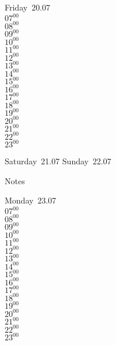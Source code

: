 \documentclass[11pt, a4paper]{book}\usepackage[]{graphicx}\usepackage[]{color}
\begin{document}
\begin{weekdaybox}
  Friday~20.07\\
  { 
  \vfill
  $07^{00}$\\
$08^{00}$\\
$09^{00}$\\
$10^{00}$\\
$11^{00}$\\
$12^{00}$\\
$13^{00}$\\
$14^{00}$\\
$15^{00}$\\
$16^{00}$\\
$17^{00}$\\
$18^{00}$\\
$19^{00}$\\
$20^{00}$\\
$21^{00}$\\
$22^{00}$\\
$23^{00}$\\
  }
\end{weekdaybox}
\begin{weekendbox}
  Saturday~21.07
  \tcblower
  Sunday~22.07
\end{weekendbox} %
\begin{notebox}
  Notes
\end{notebox}
\clearpage
\begin{headerbox}
\end{headerbox}
\begin{weekdaybox}
  Monday~23.07\\
  { 
  \vfill
  $07^{00}$\\
$08^{00}$\\
$09^{00}$\\
$10^{00}$\\
$11^{00}$\\
$12^{00}$\\
$13^{00}$\\
$14^{00}$\\
$15^{00}$\\
$16^{00}$\\
$17^{00}$\\
$18^{00}$\\
$19^{00}$\\
$20^{00}$\\
$21^{00}$\\
$22^{00}$\\
$23^{00}$\\
  }
\end{weekdaybox}
\end{document}
